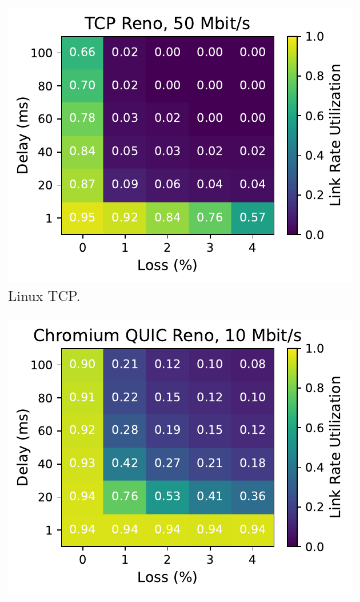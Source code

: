 \begin{figure}[ht]
\begin{subfigure}[b]{0.22\linewidth}
        \includegraphics[width=\linewidth,trim={0 0 2cm 0},clip]{splitting-paper/figures/heatmaps/heatmap_tcp_reno_50mbps.pdf}
        \caption{Linux TCP.}
    \end{subfigure}
    \begin{subfigure}[b]{0.22\linewidth}
        \includegraphics[width=\linewidth,trim={0 0 2cm 0},clip]{splitting-paper/figures/heatmaps/heatmap_quic_reno_10mbps.pdf}

\end{subfigure}
\end{figure}

